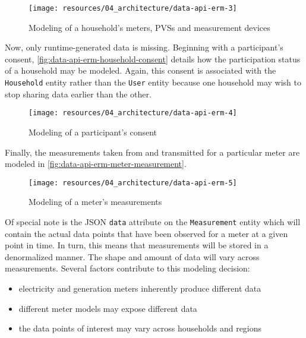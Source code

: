 \begin{figure}[hbt]
  \centering
  \texttt{[image: resources/04\_architecture/data-api-erm-3]}
  \caption{Modeling of a household's meters, \acsp{PVS} and measurement devices}
  \label{fig:data-api-erm-household-meter-device-pv}
\end{figure}

\FloatBarrier

Now, only runtime-generated data is missing. Beginning with a participant's consent, \autoref{fig:data-api-erm-household-consent} details how the participation status of a household may be modeled. Again, this consent is associated with the \texttt{Household} entity rather than the \texttt{User} entity because one household may wish to stop sharing data earlier than the other.

\begin{figure}[hbt]
  \centering
  \texttt{[image: resources/04\_architecture/data-api-erm-4]}
  \caption{Modeling of a participant's consent}
  \label{fig:data-api-erm-household-consent}
\end{figure}

\FloatBarrier

Finally, the measurements taken from and transmitted for a particular meter are modeled in \autoref{fig:data-api-erm-meter-measurement}.

\begin{figure}[hbt]
  \centering
  \texttt{[image: resources/04\_architecture/data-api-erm-5]}
  \caption{Modeling of a meter's measurements}
  \label{fig:data-api-erm-meter-measurement}
\end{figure}

\FloatBarrier

Of special note is the \acs{JSON} \texttt{data} attribute on the \texttt{Measurement} entity which will contain the actual data points that have been observed for a meter at a given point in time. In turn, this means that measurements will be stored in a denormalized manner. The shape and amount of data will vary across measurements. Several factors contribute to this modeling decision:

\begin{itemize}
  \item electricity and generation meters inherently produce different data
  \item different meter models may expose different data
  \item the data points of interest may vary across households and regions
\end{itemize}

